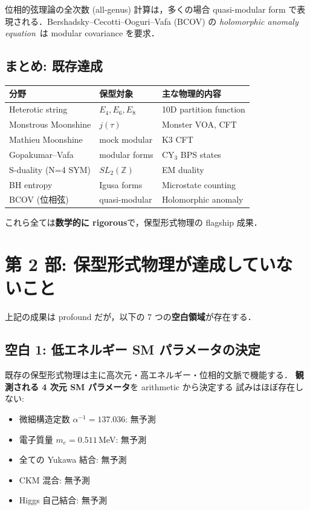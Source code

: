 \documentclass[11pt,a4paper]{article}
\begin{document}
位相的弦理論の全次数 (all-genus) 計算は，多くの場合 quasi-modular
form で表現される．Bershadsky--Cecotti--Ooguri--Vafa (BCOV) の
\textit{holomorphic anomaly equation}~\cite{BCOV1994}は modular
covariance を要求．

\subsection{まとめ: 既存達成}

\begin{center}
\begin{tabular}{lll}
\toprule
分野 & 保型対象 & 主な物理的内容 \\
\midrule
Heterotic string & $E_4, E_6, E_8$ & 10D partition function \\
Monstrous Moonshine & $j(\tau)$ & Monster VOA, CFT \\
Mathieu Moonshine & mock modular & K3 CFT \\
Gopakumar--Vafa & modular forms & CY$_3$ BPS states \\
S-duality (N=4 SYM) & $SL_2(\mathbb{Z})$ & EM duality \\
BH entropy & Igusa forms & Microstate counting \\
BCOV (位相弦) & quasi-modular & Holomorphic anomaly \\
\bottomrule
\end{tabular}
\end{center}

これら全ては\textbf{数学的に rigorous}で，保型形式物理の
flagship 成果．

\section{第 2 部: 保型形式物理が達成していないこと}

上記の成果は profound だが，以下の 7 つの\textbf{空白領域}が存在する．

\subsection{空白 1: 低エネルギー SM パラメータの決定}

既存の保型形式物理は主に高次元・高エネルギー・位相的文脈で機能する．
\textbf{観測される 4 次元 SM パラメータ}を arithmetic から決定する
試みはほぼ存在しない:

\begin{itemize}
\item 微細構造定数 $\alpha^{-1} = 137.036$: 無予測
\item 電子質量 $m_e = 0.511\,$MeV: 無予測
\item 全ての Yukawa 結合: 無予測
\item CKM 混合: 無予測
\item Higgs 自己結合: 無予測
\end{itemize}
\end{document}

